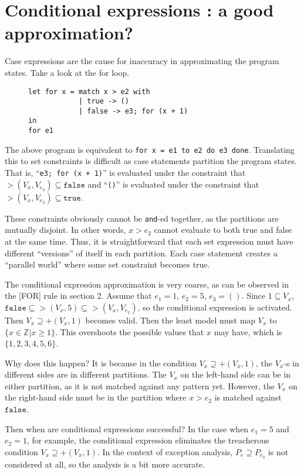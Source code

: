 \documentclass{article}
\newcommand\vbar{|}
\begin{document}
\section{Conditional expressions : a good approximation?}

Case expressions are the cause for inaccuracy in approximating the program states. Take a look at the for loop.
\begin{figure}[htb]
\centering
\begin{BVerbatim}
let for x = match x > e2 with
            | true -> ()
            | false -> e3; for (x + 1)
in
for e1
\end{BVerbatim}
\end{figure}

The above program is equivalent to \texttt{for x = e1 to e2 do e3 done}. Translating this to set constraints is difficult as case statements partition the program states.
That is, ``\texttt{e3; for (x + 1)}'' is evaluated under the constraint that $>(V_{x},V_{e_{2}})\subseteq \mathtt{false}$ and ``\texttt{()}'' is evaluated under the constraint that $>(V_{x}, V_{e_{2}})\subseteq \mathtt{true}$.

These constraints obviously cannot be \texttt{and}-ed together, as the partitions are mutually disjoint. In other words, $x > e_{2}$ cannot evaluate to both true and false at the same time. Thus, it is straightforward that each set expression must have different ``versions'' of itself in each partition. Each case statement creates a ``parallel world'' where some set constraint becomes true.

The conditional expression approximation is very coarse, as can be observed in the [FOR] rule in section 2. Assume that $e_{1}=1$, $e_{2}=5$, $e_{3}=()$. Since $1\subseteq V_{x}$, $\mathtt{false}\subseteq >(V_{x}, 5)\subseteq >(V_{x}, V_{e_{2}})$, so the conditional expression is activated. Then $V_{x}\supseteq +(V_{x}, 1)$ becomes valid. Then the least model must map $V_{x}$ to $\{x\in\mathbb{Z}\vbar x \ge 1\}$. This overshoots the possible values that $x$ may have, which is $\{1, 2, 3, 4, 5, 6\}$.

Why does this happen? It is because in the condition $V_{x}\supseteq +(V_{x}, 1)$, the $V_{x}$-s in different sides are in different partitions. The $V_{x}$ on the left-hand side can be in either partition, as it is not matched against any pattern yet. However, the $V_{x}$ on the right-hand side must be in the partition where $x>e_{2}$ is matched against $\mathtt{false}$.

Then when are conditional expressions successful? In the case when $e_{1}=5$ and $e_{2}=1$, for example, the conditional expression eliminates the treacherous condition $V_{x}\supseteq +(V_{x}, 1)$. In the context of exception analysis, $P_{e}\supseteq P_{e_{3}}$ is not considered at all, so the analysis is a bit more accurate.
\end{document}
